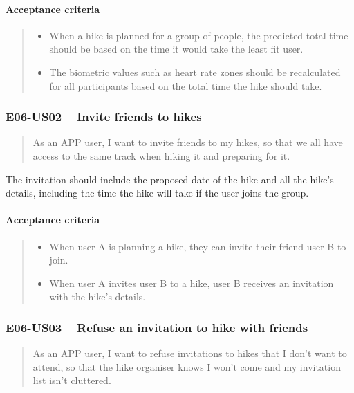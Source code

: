 \paragraph*{Acceptance criteria}
\begin{quote}
\begin{itemize}
    \item When a hike is planned for a group of people, the predicted total time should be based on the time it would take the least fit user.
    \item The biometric values such as heart rate zones should be recalculated for all participants based on the total time the hike should take.
\end{itemize}
\end{quote}


\subsubsection*{E06-US02 -- Invite friends to hikes}
\begin{quote}
As an APP user, I want to invite friends to my hikes, so that we all have access to the same track when hiking it and preparing for it.
\end{quote}

The invitation should include the proposed date of the hike and all the hike's details, including the time the hike will take if the user joins the group.

\paragraph*{Acceptance criteria}
\begin{quote}
\begin{itemize}
    \item When user A is planning a hike, they can invite their friend user B to join. 
    \item When user A invites user B to a hike, user B receives an invitation with the hike's details.
\end{itemize}
\end{quote}

\subsubsection*{E06-US03 -- Refuse an invitation to hike with friends}
\begin{quote}
As an APP user, I want to refuse invitations to hikes that I don't want to attend, so that the hike organiser knows I won't come and my invitation list isn't cluttered.
\end{quote}

